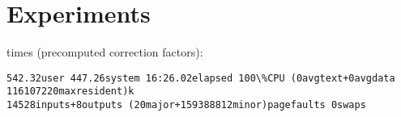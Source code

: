 \chapter{Experiments}\label{chap:experiments}





times (precomputed correction factors):
\begin{verbatim}
542.32user 447.26system 16:26.02elapsed 100\%CPU (0avgtext+0avgdata 116107220maxresident)k
14528inputs+8outputs (20major+159388812minor)pagefaults 0swaps
\end{verbatim}




